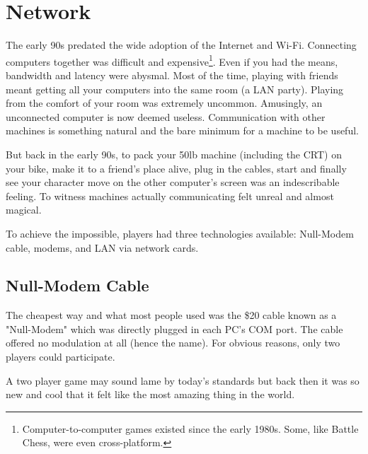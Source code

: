 \vspace{-15pt}
\section{Network}
The early 90s predated the wide adoption of the Internet and Wi-Fi. Connecting computers together was difficult and expensive\footnote{Computer-to-computer games existed since the early 1980s. Some, like Battle Chess, were even cross-platform.}. Even if you had the means, bandwidth and latency were abysmal. Most of the time, playing with friends meant getting all your computers into the same room (a LAN party). Playing from the comfort of your room was extremely uncommon. Amusingly, an unconnected computer is now deemed useless. Communication with other machines is something natural and the bare minimum for a machine to be useful.\\
\par
 But back in the early 90s, to pack your 50lb machine (including the CRT) on your bike, make it to a friend's place alive, plug in the cables, start \doom{} and finally see your character move on the other computer's screen was an indescribable feeling. To witness machines actually communicating felt unreal and almost magical.\\
\par 
To achieve the impossible, players had three technologies available: Null-Modem cable, modems, and LAN via network cards.









\subsection{Null-Modem Cable}
The cheapest way and what most people used was the \$20 cable known as a "Null-Modem" which was directly plugged in each PC's COM port. The cable offered no modulation at all (hence the name). For obvious reasons, only two players could participate.\\
\par 
{}
\par
 A two player game may sound lame by today's standards but back then it was so new and cool that it felt like the most amazing thing in the world.







